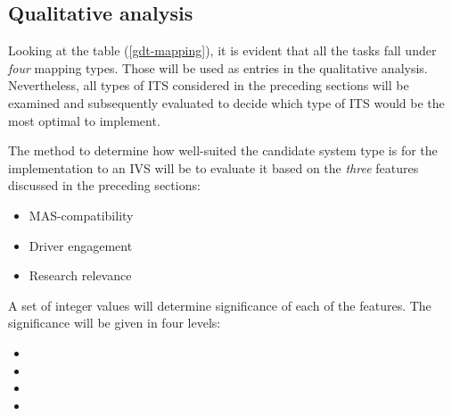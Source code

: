 \documentclass[main.tex]{subfiles}
\begin{document}
\subsection{Qualitative analysis}

Looking at the table (\ref{gdt-mapping}), it is evident that all the tasks fall under \emph{four} 
mapping types. Those will be used as entries in the qualitative analysis. Nevertheless,
all types of ITS considered in the preceding sections will be examined and subsequently
evaluated to decide which type of ITS would be the most optimal to implement. 

The method to determine how well-suited the candidate system type is for the implementation to an IVS 
will be to evaluate it based on the \emph{three} features discussed in the preceding sections: 

\begin{itemize}
    \item MAS-compatibility
    \item Driver engagement
    \item Research relevance
\end{itemize}

A set of integer values will determine significance of each of the features. The significance
will be given in four levels:

\begin{itemize}
    \item {}
    \item {}
    \item {}
    \item {}
\end{itemize}
\end{document}
